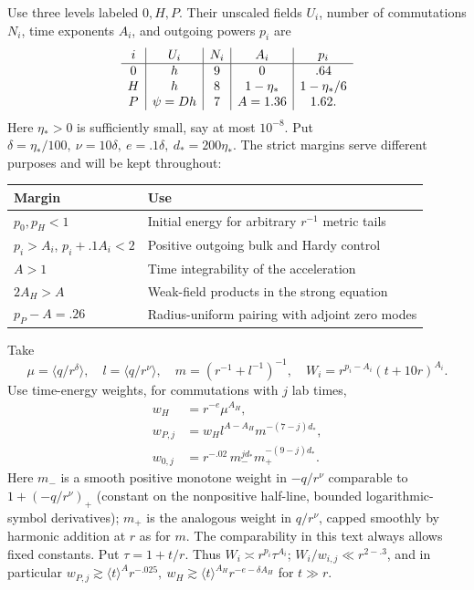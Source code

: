 Use three levels labeled \(0,H,P\). Their unscaled fields \(U_i\), number of commutations \(N_i\), time exponents \(A_i\), and outgoing powers \(p_i\) are
\begin{equation*}
\begin{array}{c|c|c|c|c}
 i&U_i&N_i&A_i&p_i\cr\hline
 0&h&9&0&.64\cr
 H&h&8&1-\eta_*&1-\eta_*/6\cr
 P&\psi=D h&7&A=1.36&1.62 .
 \end{array}
\end{equation*}
Here \(\eta_*>0\) is sufficiently small, say at most \(10^{-8}\). Put \(\delta=\eta_*/100,\ \nu=10\delta,\ e=.1\delta,\ d_*=200\eta_*\).
The strict margins serve different purposes and will be kept throughout:
\begin{center}
\begin{tabular}{@{}ll@{}}
\toprule
Margin & Use \\
\midrule
$p_0,p_H<1$ & Initial energy for arbitrary $r^{-1}$ metric tails \\
$p_i>A_i$, $p_i+.1A_i<2$ & Positive outgoing bulk and Hardy control \\
$A>1$ & Time integrability of the acceleration \\
$2A_H>A$ & Weak-field products in the strong equation \\
$p_P-A=.26$ & Radius-uniform pairing with adjoint zero modes \\
\bottomrule
\end{tabular}
\end{center}
Take
\begin{equation*}
\mu=\langle q/r^\delta\rangle,\quad l=\langle q/r^\nu\rangle,\quad
 m=(r^{-1}+l^{-1})^{-1},\quad W_i=r^{p_i-A_i}(t+10r)^{A_i}.
\end{equation*}
Use time-energy weights, for commutations with \(j\) lab times,
\begin{equation*}
\begin{split}
 w_H&=r^{-e}\mu^{A_H},\\
 w_{P,j}&=w_H l^{A-A_H}m^{-(7-j)d_*},\\
 w_{0,j}&=r^{-.02}\,m_-^{j d_*}m_+^{-(9-j)d_*}.
\end{split}
\end{equation*}
Here \(m_-\) is a smooth positive monotone weight in \(-q/r^\nu\) comparable to \(1+(-q/r^\nu)_+\) (constant on the nonpositive half-line, bounded logarithmic-symbol derivatives); \(m_+\) is the analogous weight in \(q/r^\nu\), capped smoothly by harmonic addition at \(r\) as for \(m\). The comparability in this text always allows fixed constants. Put \(\tau=1+t/r\). Thus \(W_i\asymp r^{p_i}\tau^{A_i}\); \(W_i/w_{i,j}\ll r^{2-.3}\), and in particular \(w_{P,j}\gtrsim \langle t\rangle^A r^{-.025},\ w_H\gtrsim \langle t\rangle^{A_H} r^{-e-\delta A_H}\) for \(t\gg r\).


